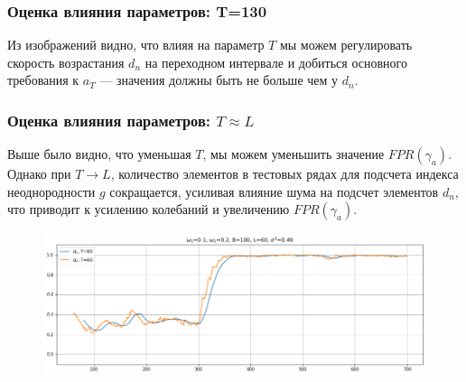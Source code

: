 \documentclass[11pt]{beamer}
\begin{document}
	\begin{frame}
		\frametitle{Оценка влияния параметров: T=130}
		
		\begin{figure}[b]
			\centering
			
			\smallskip
		\end{figure}
		
		Из изображений видно, что влияя на параметр $ T $ мы можем регулировать скорость возрастания $ d_n $ на переходном интервале и добиться основного требования к $ a_T $ --- значения должны быть не больше чем у $ d_n $.
		
	\end{frame}
	
	\begin{frame}
		\frametitle{Оценка влияния параметров: $ T \approx L $}
		Выше было видно, что уменьшая $ T $, мы можем уменьшить значение $ FPR(\gamma_a) $. Однако при $ T \rightarrow L $, количество элементов в тестовых рядах для подсчета индекса неоднородности $ g $ сокращается, усиливая влияние шума на подсчет элементов $ d_{n} $, что приводит к усилению колебаний и увеличению $ FPR(\gamma_a) $.
		
		\begin{figure}[b]
			\centering
			\includegraphics[width=\linewidth]{imgs/decreasing_T.png}
		\end{figure}
	\end{frame}
	
\end{document}
